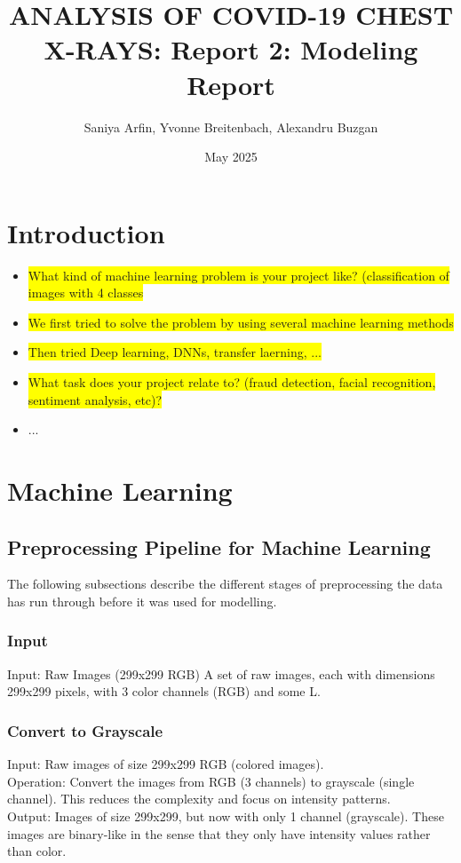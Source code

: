 \documentclass{article}
\title{ANALYSIS OF COVID-19 CHEST X-RAYS: Report 2: Modeling Report}
\author{Saniya Arfin, Yvonne Breitenbach, Alexandru Buzgan}
\date{May 2025}
\begin{document}
\maketitle

\tableofcontents

\newpage 

\section{Introduction}

\begin{itemize}
    \item \colorbox{yellow}{What kind of machine learning problem is your project like? (classification of images with 4 classes}
    \item \colorbox{yellow}{We first tried to solve the problem by using several machine learning methods}
    \item \colorbox{yellow}{Then tried Deep learning, DNNs, transfer laerning, ...}
    \item \colorbox{yellow}{What task does your project relate to? (fraud detection, facial recognition, sentiment analysis, etc)?}
    \item ...
\end{itemize}

\section{Machine Learning}

\subsection{Preprocessing Pipeline for Machine Learning} \label{preprocessing_pipeline}
The following subsections describe the different stages of preprocessing the data has run through before it was used for modelling.
\subsubsection{Input}
Input: Raw Images (299x299 RGB)
A set of raw images, each with dimensions 299x299 pixels, with 3 color channels (RGB) and some L.

\subsubsection{Convert to Grayscale}
Input: Raw images of size 299x299 RGB (colored images).\\
Operation: Convert the images from RGB (3 channels) to grayscale (single channel). This reduces the complexity and focus on intensity patterns.\\
Output: Images of size 299x299, but now with only 1 channel (grayscale). These images are binary-like in the sense that they only have intensity values rather than color.
\end{document}
